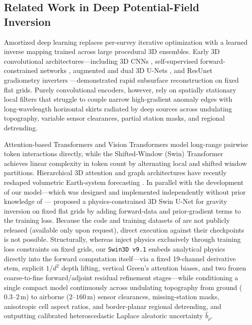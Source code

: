 \documentclass[11pt,a4paper]{article}
\begin{document}
\subsection{Related Work in Deep Potential-Field Inversion}

Amortized deep learning replaces per-survey iterative optimization with a learned inverse mapping trained across large procedural 3D ensembles. Early 3D convolutional architectures---including 3D CNNs \citep{huang2021deep,yang2022gravity}, self-supervised forward-constrained networks \citep{li2022selfsup}, augmented and dual 3D U-Nets \citep{zhou2023unet,dong2023dualunet}, and ResUnet gradiometry inverters \citep{xu2023resunet}---demonstrated rapid subsurface reconstruction on fixed flat grids. Purely convolutional encoders, however, rely on spatially stationary local filters that struggle to couple narrow high-gradient anomaly edges with long-wavelength horizontal skirts radiated by deep sources across undulating topography, variable sensor clearances, partial station masks, and regional detrending.

Attention-based Transformers \citep{vaswani2017} and Vision Transformers \citep{dosovitskiy2021} model long-range pairwise token interactions directly, while the Shifted-Window (Swin) Transformer \citep{liu2021swin} achieves linear complexity in token count by alternating local and shifted window partitions. Hierarchical 3D attention and graph architectures have recently reshaped volumetric Earth-system forecasting \citep{bi2023pangu,lam2023graphcast,nguyen2023climax}. In parallel with the development of our model---which was designed and implemented independently without prior knowledge of \citet{yu2025swin}---\citet{yu2025swin} proposed a physics-constrained 3D Swin U-Net for gravity inversion on fixed flat grids by adding forward-data and prior-gradient terms to the training loss. Because the code and training datasets of \citet{yu2025swin} are not publicly released (available only upon request), direct execution against their checkpoints is not possible. Structurally, whereas \citet{yu2025swin} inject physics exclusively through training loss constraints on fixed grids, our \texttt{Swin3D v9.1} embeds analytical physics directly into the forward computation itself---via a fixed 19-channel derivative stem, explicit $1/d^2$ depth lifting, vertical Green's attention biases, and two frozen coarse-to-fine forward/adjoint residual refinement stages---while conditioning a single compact model continuously across undulating topography from ground ($0.3\text{--}2$\,m) to airborne ($2\text{--}160$\,m) sensor clearances, missing-station masks, anisotropic cell aspect ratios, and border-planar regional detrending, and outputting calibrated heteroscedastic Laplace aleatoric uncertainty $\hat{b}_\rho$.
\end{document}
